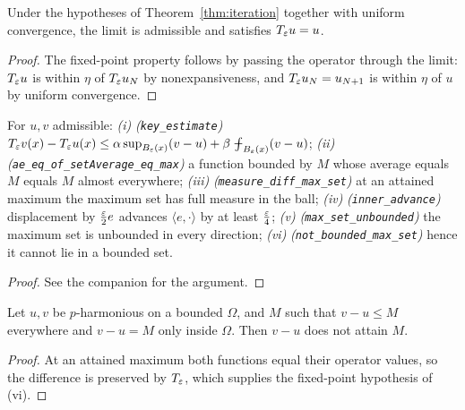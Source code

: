 \begin{theorem}\label{thm:existence}
\leanok
Under the hypotheses of Theorem~\ref{thm:iteration} together with uniform
convergence, the limit is admissible and satisfies $T_\varepsilon u = u$.
\end{theorem}

\begin{proof}
\leanok
{}
The fixed-point property follows by passing the operator through the limit:
$T_\varepsilon u$ is within $\eta$ of $T_\varepsilon u_N$ by nonexpansiveness, and
$T_\varepsilon u_N = u_{N+1}$ is within $\eta$ of $u$ by uniform convergence.
\end{proof}


\begin{theorem}\label{thm:comparison}
\leanok
{}
For $u,v$ admissible:
\emph{(i)} \emph{(\texttt{key\_estimate})}
$\Op v(x) - \Op u(x) \le \alpha \sup_{B_\eps(x)}(v-u)
  + \beta \avgint_{B_\eps(x)}(v-u)$;
\emph{(ii)} \emph{(\texttt{ae\_eq\_of\_setAverage\_eq\_max})} a function
bounded by $M$ whose average equals $M$ equals $M$ almost everywhere;
\emph{(iii)} \emph{(\texttt{measure\_diff\_max\_set})} at an attained maximum
the maximum set has full measure in the ball;
\emph{(iv)} \emph{(\texttt{inner\_advance})} displacement by
$\tfrac{\varepsilon}{2}e$ advances $\langle e,\cdot\rangle$ by at least
$\tfrac{\varepsilon}{4}$;
\emph{(v)} \emph{(\texttt{max\_set\_unbounded})} the maximum set is unbounded
in every direction;
\emph{(vi)} \emph{(\texttt{not\_bounded\_max\_set})} hence it cannot lie in a
bounded set.
\end{theorem}

\begin{proof}
\leanok
See the companion for the argument.
\end{proof}


\begin{theorem}\label{thm:comparisonfinal}
\leanok
Let $u,v$ be $p$-harmonious on a bounded $\Omega$, and $M$ such that
$v-u \le M$ everywhere and $v-u=M$ only inside $\Omega$. Then $v-u$ does not
attain $M$.
\end{theorem}

\begin{proof}
\leanok
{}
At an attained maximum both functions equal their operator values, so the
difference is preserved by $T_\varepsilon$, which supplies the fixed-point hypothesis of
(vi).
\end{proof}


